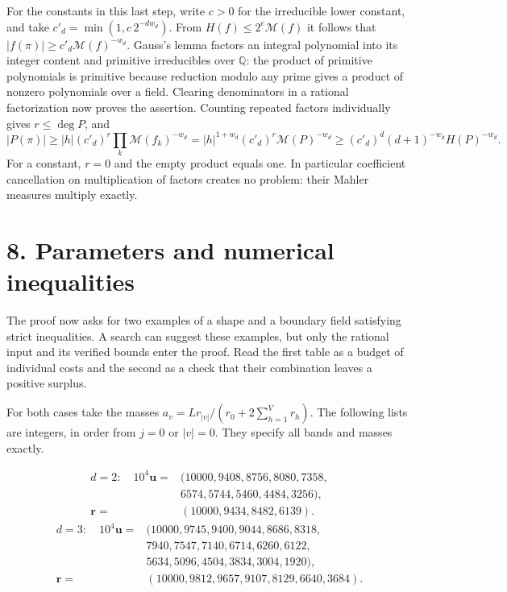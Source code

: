 \documentclass[11pt,a4paper]{article}
\begin{document}
For the constants in this last step, write \(c>0\) for the irreducible lower constant, and take \(c'_d=\min(1,c\,2^{-dw_d})\). From \(H(f)\le2^e\mathcal M(f)\) it follows that \(|f(\pi)|\ge c'_d\mathcal M(f)^{-w_d}\). Gauss's lemma factors an integral polynomial into its integer content and primitive irreducibles over \(\mathbb Q\): the product of primitive polynomials is primitive because reduction modulo any prime gives a product of nonzero polynomials over a field. Clearing denominators in a rational factorization now proves the assertion. Counting repeated factors individually gives \(r\le\deg P\), and \[
 |P(\pi)|\ge |h|(c'_d)^r\prod_k\mathcal M(f_k)^{-w_d}
 = |h|^{1+w_d}(c'_d)^r\mathcal M(P)^{-w_d}
 \ge (c'_d)^d(d+1)^{-w_d} H(P)^{-w_d}.
\] For a constant, \(r=0\) and the empty product equals one. In particular coefficient cancellation on multiplication of factors creates no problem: their Mahler measures multiply exactly.

\section{8. Parameters and numerical inequalities}\label{parameters-and-numerical-inequalities}

The proof now asks for two examples of a shape and a boundary field satisfying strict inequalities. A search can suggest these examples, but only the rational input and its verified bounds enter the proof. Read the first table as a budget of individual costs and the second as a check that their combination leaves a positive surplus.

For both cases take the masses \(a_v=Lr_{|v|}/(r_0+2\sum_{h=1}^V r_h)\). The following lists are integers, in order from \(j=0\) or \(|v|=0\). They specify all bands and masses exactly.

\[
\begin{aligned}
 d=2:\quad 10^4\mathbf u={}&(10000,9408,8756,8080,7358,\\
 &6574,5744,5460,4484,3256),\\
 \mathbf r={}&(10000,9434,8482,6139).
\end{aligned}
\] \[
\begin{aligned}
 d=3:\quad 10^4\mathbf u={}&(10000,9745,9400,9044,8686,8318,\\
 &7940,7547,7140,6714,6260,6122,\\
 &5634,5096,4504,3834,3004,1920),\\
 \mathbf r={}&(10000,9812,9657,9107,8129,6640,3684).
\end{aligned}
\]
\end{document}
